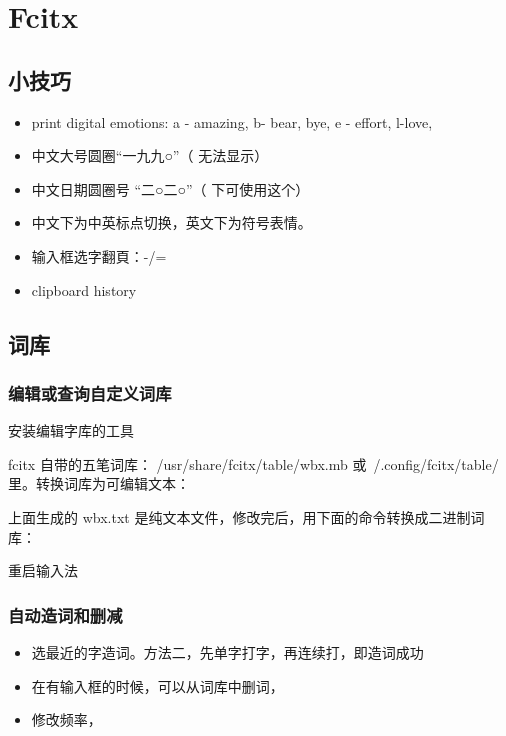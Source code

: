 \chapter{Fcitx}

\section{小技巧}

\begin{itemize}
\item {} print digital emotions: a - amazing, b- bear, bye,  e - effort, l-love,
\item {} 中文大号圆圈“一九九○”（ 无法显示）
\item {} 中文日期圆圈号 “二○二○”（ 下可使用这个）
\item {} 中文下为中英标点切换，英文下为符号表情。
\item 输入框选字翻頁：-/=
\item{} clipboard history
\end{itemize}

\section{词库}
\subsection{编辑或查询自定义词库}
 安装编辑字库的工具

fcitx 自带的五笔词库： /usr/share/fcitx/table/wbx.mb 或~/.config/fcitx/table/里。转换词库为可编辑文本：


上面生成的 wbx.txt 是纯文本文件，修改完后，用下面的命令转换成二进制词库：


 重启输入法

\subsection{自动造词和删减}
\begin{itemize}
\item {} 选最近的字造词。方法二，先单字打字，再连续打，即造词成功
\item {} 在有输入框的时候，可以从词库中删词，
\item {} 修改频率，
\end{itemize}


